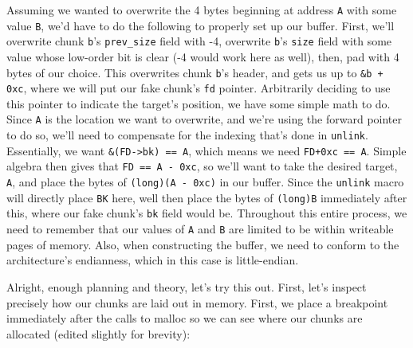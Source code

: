 Assuming we wanted to overwrite the 4 bytes beginning at address \texttt{A} with
some value \texttt{B}, we'd have to do the following to properly set up our
buffer. First, we'll overwrite chunk \texttt{b}'s \texttt{prev\_size} field with
-4, overwrite \texttt{b}'s \texttt{size} field with some value whose low-order bit
is clear (-4 would work here as well), then, pad with 4 bytes of our choice. This
overwrites chunk \texttt{b}'s header, and gets us up to \texttt{\&b + 0xc}, where
we will put our fake chunk's \texttt{fd} pointer. Arbitrarily deciding to use this pointer
to indicate the target's position, we have some simple math to do. Since \texttt{A}
is the location we want to overwrite, and we're using the forward pointer
to do so, we'll need to compensate for the indexing that's done in \texttt{unlink}.
Essentially, we want \texttt{\&(FD->bk) == A}, which means we need \texttt{FD+0xc == A}.
Simple algebra then gives that \texttt{FD == A - 0xc}, so we'll want to take the
desired target, \texttt{A}, and place the bytes of \texttt{(long)(A - 0xc)} in our
buffer. Since the \texttt{unlink} macro will directly place \texttt{BK} here,
well then place the bytes of \texttt{(long)B} immediately after this, where our fake
chunk's \texttt{bk} field would be. Throughout this entire process, we
need to remember that our values of \texttt{A} and \texttt{B} are limited to
be within writeable pages of memory. Also, when constructing the buffer, we need
to conform to the architecture's endianness, which in this case is little-endian.

Alright, enough planning and theory, let's try this out. First, let's inspect
precisely how our chunks are laid out in memory. First, we place a breakpoint 
immediately after the calls to malloc so we can see where our chunks are allocated
(edited slightly for brevity):

